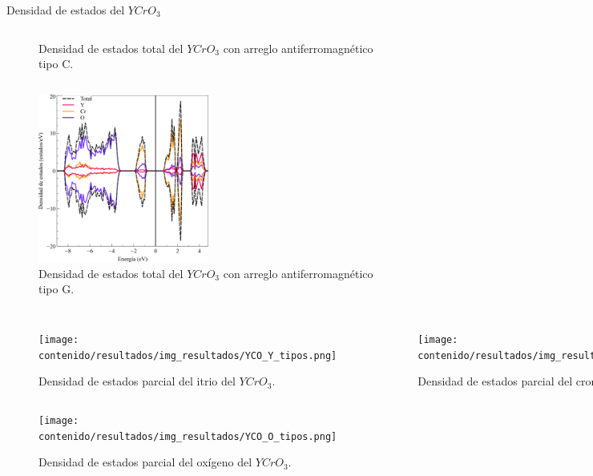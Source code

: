 \begin{frame}{Densidad de estados del $YCrO_{3}$}
\begin{columns}[t]
\begin{figure}[H]
        \caption{Densidad de estados total del $YCrO_{3}$ con arreglo 
            antiferromagn\'etico tipo C.}
    \end{figure}
\end{columns} 
\end{frame}

\begin{frame}
\begin{figure}[H]
    \centering
    \includegraphics[width=0.5\textwidth]{contenido/resultados/img_resultados/YCO_DOS_G.png}
    \caption{Densidad de estados total del $YCrO_{3}$ con arreglo 
        antiferromagn\'etico tipo G.}
\end{figure}
\end{frame}

\begin{frame}
\begin{columns}[t]
    \begin{figure}[H]
        \centering
        \texttt{[image: contenido/resultados/img\_resultados/YCO\_Y\_tipos.png]}
        \caption{Densidad de estados parcial del itrio del $YCrO_{3}$.}
    \end{figure}
    \begin{figure}[H]
        \centering
        \texttt{[image: contenido/resultados/img\_resultados/YCO\_Cr\_tipos.png]}
        \caption{Densidad de estados parcial del cromo del $YCrO_{3}$.}
    \end{figure}
\end{columns}
\end{frame}

\begin{frame}
     \begin{figure}[H]
    \centering
    \texttt{[image: contenido/resultados/img\_resultados/YCO\_O\_tipos.png]}
    \caption{Densidad de estados parcial del ox\'igeno del $YCrO_{3}$.}
    \end{figure}
\end{frame}